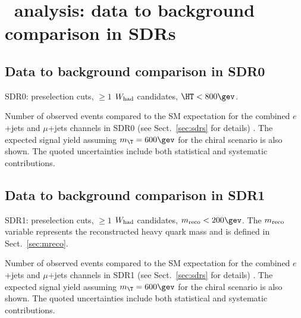 \clearpage{\pagestyle{empty}\cleardoublepage}

\chapter{\wbx\ analysis: data to background comparison in SDRs}\label{app:wbxSDRs}

\section{Data to background comparison in SDR0}
\label{sec:DataMC_CR0}

SDR0: preselection cuts, $\geq 1$ $W_{\rm had}$ candidates, $\HT<800\gev$. 

\begin{table}[h!]
\begin{center}

\caption{\small{Number of observed events compared to the SM expectation for
the combined $e$+jets and $\mu$+jets channels in SDR0 (see Sect.~\ref{sec:sdrs} for details) . 
The expected signal yield assuming $m_{\T}=600\gev$ for the chiral scenario is also shown. 
The quoted uncertainties include both statistical and systematic contributions.}}
\label{tab:CR0_1W_evtable}
\end{center}
\end{table}

\clearpage
%


\clearpage

\section{Data to background comparison in SDR1}
\label{sec:DataMC_CR5}

SDR1: preselection cuts, $\geq 1$ $W_{\rm had}$ candidates, $m_{\rm reco}<200\gev$. The $m_{\rm reco}$ variable represents the
reconstructed heavy quark mass and is defined in Sect.~\ref{sec:mreco}. 

\begin{table}[h!]
\begin{center}

\caption{\small{Number of observed events compared to the SM expectation for
the combined $e$+jets and $\mu$+jets channels in SDR1 (see Sect.~\ref{sec:sdrs} for details) . 
The expected signal yield assuming $m_{\T}=600\gev$ for the chiral scenario is also shown. 
The quoted uncertainties include both statistical and systematic contributions.}}
\label{tab:CR5_1W_evtable}
\end{center}
\end{table}

